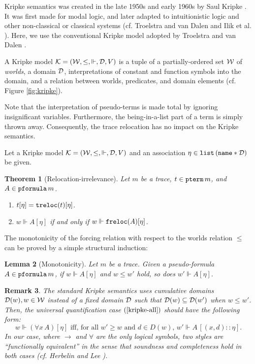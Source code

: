 \documentclass{svjour3}                     %
\newtheorem{thm}{Theorem}%
\newtheorem{lem}[thm]{Lemma}
\newtheorem{rem}[thm]{Remark}
\newcommand{\cald}{{\cal D}}
\newcommand{\calk}{{\cal K}}
\newcommand{\calw}{{\cal W}}
\newcommand{\Vd}{\Vdash}
\newcommand{\tnat}{\textup{\tt name}}
\newcommand{\tpterm}{\textup{\tt pterm}}
\newcommand{\tpfml}{\textup{\tt pformula}}
\newcommand{\tlist}{\textup{\tt list}}
\newcommand{\ttlift}{\textup{\tt treloc}}
\newcommand{\tflift}{\textup{\tt freloc}}
\begin{document}
Kripke semantics was created in the late 1950s and early 1960s by Saul Kripke \cite{kripke59,kripke63}. It was first made for modal logic, and later adapted to intuitionistic logic and other non-classical or classical systems (cf. Troelstra and van Dalen \cite{TroelstraVanDalen88} and Ilik et al. \cite{danko-gyesik}). Here, we use the conventional Kripke model adopted by Troelstra and van Dalen \cite{TroelstraVanDalen88}.

A Kripke model $\calk = (\calw, \le,\Vd , \cald, V )$ is a tuple of a
partially-ordered set $\calw$ of {\em worlds}, a domain $\cald$,
interpretations of constant and function symbols into the domain, and a
relation between worlds, predicates, and domain elements
(cf. Figure \ref{fig:kripke}).

Note that the interpretation of pseudo-terms is made total by ignoring
insignificant variables. Furthermore, the being-in-a-list part of a term
is simply thrown away. Consequently, the trace relocation has no impact on the Kripke semantics.

Let a Kripke model $\calk = (\calw, \le, \Vd, \cald, V)$ and an
association $\eta \in \tlist\, (\tnat \ast \cald)$ be given. 

\begin{thm}[Relocation-irrelevance]\label{thm:relocation}
  Let $m$ be a trace, $t \in \tpterm\, m$, and $A \in \tpfml\, m$. 
  \begin{enumerate}
  \item $ t [\eta] = \ttlift(t) [\eta]$.

  \item $w \Vd A [\eta]$ if and only if $w \Vd  \tflift(A) [\eta]$.
  \end{enumerate}
\end{thm}

\noindent The monotonicity of the forcing relation with respect to the worlds relation $\le$ can be proved by a simple structural induction:

\begin{lem}[Monotonicity] 
  Let $m$ be a trace. Given a pseudo-formula $A \in \tpfml\, m$, if $w \Vd A[\eta]$ and $w \le w'$ hold, so does $w' \Vd A [\eta]$.
\end{lem}

\begin{rem}\label{fun-equivalence}
The standard Kripke semantics uses cumulative domains $\cald (w), w\in \calw$ instead of a fixed domain $\cald$ such that $\cald (w) \subseteq \cald (w')$ when $w \le w'$. Then, the universal quantification case $(\ref{kripke-all})$ should have the following form:
\[
\text{$w \Vd (\forall x\, A) [\eta]$ iff, for all $w'\ge w$ and $d\in D(w)$, $w' \Vd A\, [(x,d)::\eta]$}.
\]
In our case, where $\to$ and $\forall$ are the only logical symbols, two styles are ``functionally equivalent'' in the sense that soundness and completeness hold in both cases (cf. Herbelin and Lee \cite{wollic09}).
\end{rem}
\end{document}
